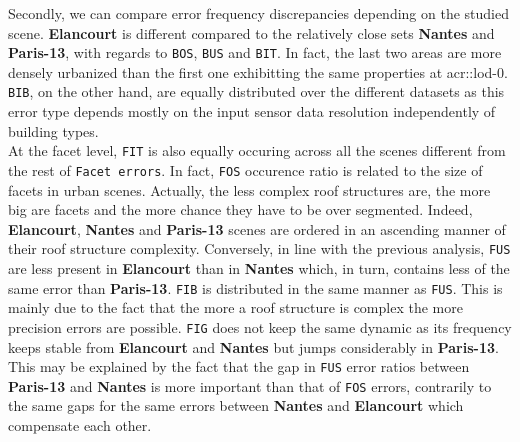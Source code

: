         Secondly, we can compare error frequency discrepancies depending on the studied scene.
        \textbf{Elancourt} is different compared to the relatively close sets \textbf{Nantes} and \textbf{Paris-13}, with regards to \texttt{BOS}, \texttt{BUS} and \texttt{BIT}.
        In fact, the last two areas are more densely urbanized than the first one exhibitting the same properties at \gls{acr::lod}-0.
        \texttt{BIB}, on the other hand, are equally distributed over the different datasets as this error type depends mostly on the input sensor data resolution independently of building types.\\
        At the facet level, \texttt{FIT} is also equally occuring across all the scenes different from the rest of \texttt{Facet errors}.
        In fact, \texttt{FOS} occurence ratio is related to the size of facets in urban scenes.
        Actually, the less complex roof structures are, the more big are facets and the more chance they have to be over segmented.
        Indeed, \textbf{Elancourt}, \textbf{Nantes} and \textbf{Paris-13} scenes are ordered in an ascending manner of their roof structure complexity.
        Conversely, in line with the previous analysis, \texttt{FUS} are less present in \textbf{Elancourt} than in \textbf{Nantes} which, in turn, contains less of the same error than \textbf{Paris-13}.
        \texttt{FIB} is distributed in the same manner as \texttt{FUS}.
        This is mainly due to the fact that the more a roof structure is complex the more precision errors are possible.
        \texttt{FIG} does not keep the same dynamic as its frequency keeps stable from \textbf{Elancourt} and \textbf{Nantes} but jumps considerably in \textbf{Paris-13}.
        This may be explained by the fact that the gap in \texttt{FUS} error ratios between \textbf{Paris-13} and \textbf{Nantes} is more important than that of \texttt{FOS} errors, contrarily to the same gaps for the same errors between \textbf{Nantes} and \textbf{Elancourt} which compensate each other.


